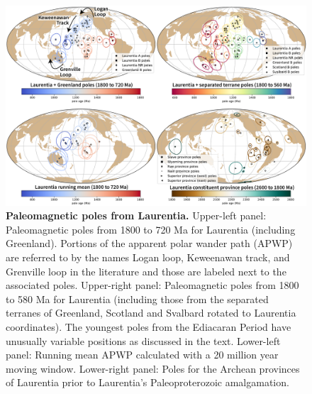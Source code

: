 \documentclass[twocolumn, switch]{article} %
\begin{document}
\begin{figure}
\centering
\includegraphics[width=\textwidth]{../Figures/Fig3_Laurentia_poles_combined.pdf}
\caption{\textbf{Paleomagnetic poles from Laurentia.} Upper-left panel: Paleomagnetic poles from 1800 to 720 Ma for Laurentia (including Greenland). Portions of the apparent polar wander path (APWP) are referred to by the names Logan loop, Keweenawan track, and Grenville loop in the literature and those are labeled next to the associated poles. Upper-right panel:  Paleomagnetic poles from 1800 to 580 Ma for Laurentia (including those from the separated terranes of Greenland, Scotland and Svalbard rotated to Laurentia coordinates). The youngest poles from the Ediacaran Period have unusually variable positions as discussed in the text. Lower-left panel: Running mean APWP calculated with a 20 million year moving window. Lower-right panel: Poles for the Archean provinces of Laurentia prior to Laurentia's Paleoproterozoic amalgamation.}
\label{fig:Laurentia_poles}
\end{figure}
\end{document}
